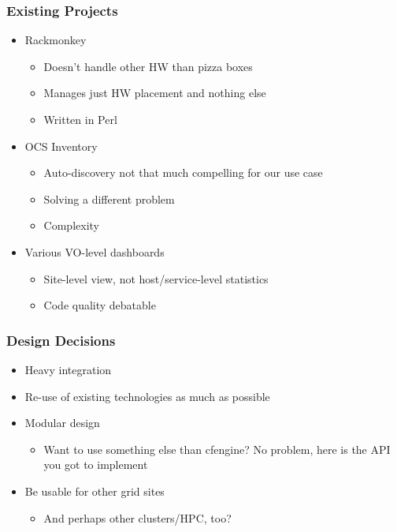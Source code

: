 \documentclass{beamer}
\begin{document}
\begin{frame}
\frametitle{Existing Projects}

\begin{itemize}
    \item Rackmonkey
        \begin{itemize}
            \item Doesn't handle other HW than pizza boxes
            \item Manages just HW placement and nothing else
            \item Written in Perl
        \end{itemize}
    \item OCS Inventory
        \begin{itemize}
            \item Auto-discovery not that much compelling for our use case
            \item Solving a different problem
            \item Complexity
        \end{itemize}
    \item Various VO-level dashboards
        \begin{itemize}
            \item Site-level view, not host/service-level statistics
            \item Code quality debatable
        \end{itemize}
\end{itemize}
\end{frame}

\begin{frame}
\frametitle{Design Decisions}

\begin{itemize}
    \item Heavy integration
    \item Re-use of existing technologies as much as possible
    \item Modular design
        \begin{itemize}
            \item Want to use something else than cfengine? No problem, here is
                the API you got to implement
        \end{itemize}
    \item Be usable for other grid sites
        \begin{itemize}
            \item And perhaps other clusters/HPC, too?
        \end{itemize}
\end{itemize}
\end{frame}
\end{document}
